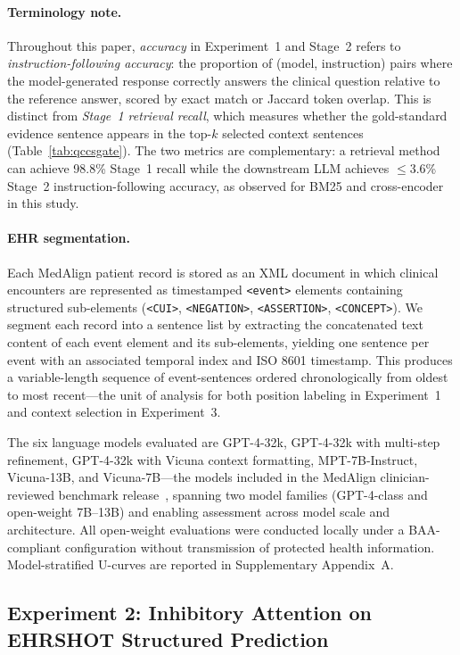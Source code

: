 \documentclass{article}
\begin{document}
\paragraph{Terminology note.}
Throughout this paper, \emph{accuracy} in Experiment~1 and Stage~2 refers to
\emph{instruction-following accuracy}: the proportion of (model, instruction)
pairs where the model-generated response correctly answers the clinical question
relative to the reference answer, scored by exact match or Jaccard token overlap.
This is distinct from \emph{Stage~1 retrieval recall}, which measures whether
the gold-standard evidence sentence appears in the top-$k$ selected context
sentences (Table~\ref{tab:qccsgate}). The two metrics are complementary: a
retrieval method can achieve 98.8\% Stage~1 recall while the downstream LLM
achieves $\leq$3.6\% Stage~2 instruction-following accuracy, as observed for BM25
and cross-encoder in this study.

\paragraph{EHR segmentation.} Each MedAlign patient record is stored as an XML
document in which clinical encounters are represented as timestamped
\texttt{<event>} elements containing structured sub-elements
(\texttt{<CUI>}, \texttt{<NEGATION>}, \texttt{<ASSERTION>}, \texttt{<CONCEPT>}).
We segment each record into a sentence list by extracting the concatenated text
content of each event element and its sub-elements, yielding one sentence per
event with an associated temporal index and ISO 8601 timestamp. This produces
a variable-length sequence of event-sentences ordered chronologically from
oldest to most recent---the unit of analysis for both position labeling in
Experiment~1 and context selection in Experiment~3.

The six language models evaluated are GPT-4-32k, GPT-4-32k with multi-step
refinement, GPT-4-32k with Vicuna context formatting, MPT-7B-Instruct,
Vicuna-13B, and Vicuna-7B---the models included in the MedAlign clinician-reviewed
benchmark release~\cite{fleming2024medalign}, spanning two model families
(GPT-4-class and open-weight 7B--13B) and enabling assessment across model scale
and architecture. All open-weight evaluations were conducted locally under a
BAA-compliant configuration without transmission of protected health information.
Model-stratified U-curves are reported in Supplementary Appendix~A.

\subsection{Experiment 2: Inhibitory Attention on EHRSHOT Structured Prediction}
\label{sec:exp2}
\end{document}
